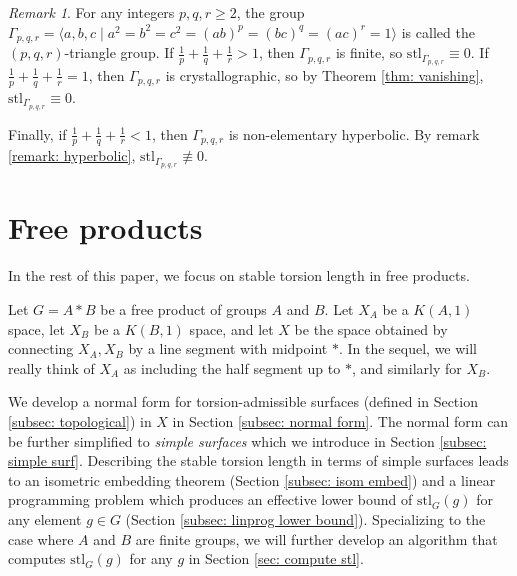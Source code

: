 \documentclass{amsart}
\theoremstyle{definition}
\newcommand{\ra}{\rangle}
\numberwithin{equation}{section}
\theoremstyle{theorem}
\theoremstyle{remark}
\newtheorem{remark}[theorem]{Remark}
\def\Z{\mathbb Z}
\def\stl{\mathrm{stl}}
\begin{document}
	\begin{remark}
		For any integers $p,q,r\ge2$, the group $\Gamma_{p,q,r}=\langle a,b,c \;|\; a^2=b^2=c^2=(ab)^p=(bc)^q=(ac)^r=1\ra$ is called the $(p,q,r)$-triangle group. If $\frac{1}{p}+\frac{1}{q}+\frac{1}{r}>1$, then $\Gamma_{p,q,r}$ is finite, so $\stl _{\Gamma_{p,q,r}}\equiv 0$. If $\frac{1}{p}+\frac{1}{q}+\frac{1}{r}=1$, then $\Gamma_{p,q,r}$ is crystallographic, so by Theorem \ref{thm: vanishing}, $\stl_{\Gamma_{p,q,r}}\equiv 0$. 
		
		Finally, if $\frac{1}{p}+\frac{1}{q}+\frac{1}{r}<1$, then $\Gamma_{p,q,r}$ is non-elementary hyperbolic. By remark \ref{remark: hyperbolic}, $\stl_{\Gamma_{p,q,r}}\not\equiv 0$. 
	\end{remark}
	
	
	\section{Free products}\label{sec: free prod}
	In the rest of this paper, we focus on stable torsion length in free products.
	
	Let $G=A*B$ be a free product of groups $A$ and $B$. Let $X_A$ be a $K(A,1)$ space, let $X_B$ be a $K(B,1)$ space, and let $X$ be the space obtained by connecting $X_A,X_B$ by a line segment with midpoint $*$. In the sequel, we will really think of $X_A$ as including the half segment up to $*$, and similarly for $X_B$.
	
	We develop a normal form for torsion-admissible surfaces (defined in Section \ref{subsec: topological}) in $X$ in Section \ref{subsec: normal form}.
	The normal form can be further simplified to \emph{simple surfaces} which we introduce in Section \ref{subsec: simple surf}. Describing the stable torsion length in terms of simple surfaces leads to an isometric embedding theorem (Section \ref{subsec: isom embed}) and a linear programming problem which produces an effective lower bound of $\stl_G(g)$ for any element $g\in G$ (Section \ref{subsec: linprog lower bound}).
	Specializing to the case where $A$ and $B$ are finite groups, we will further develop an algorithm that computes $\stl_G(g)$ for any $g$ in Section \ref{sec: compute stl}.
	
\end{document}
